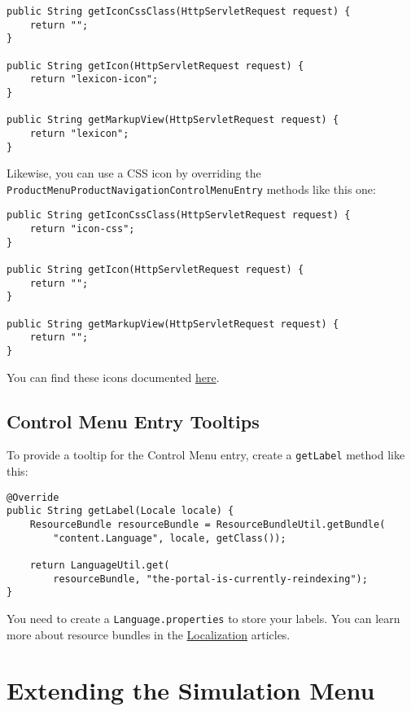 \begin{verbatim}
public String getIconCssClass(HttpServletRequest request) {
    return "";
}

public String getIcon(HttpServletRequest request) {
    return "lexicon-icon";
}

public String getMarkupView(HttpServletRequest request) {
    return "lexicon";
}
\end{verbatim}

Likewise, you can use a CSS icon by overriding the
\texttt{ProductMenuProductNavigationControlMenuEntry} methods like this
one:

\begin{verbatim}
public String getIconCssClass(HttpServletRequest request) {
    return "icon-css";
}

public String getIcon(HttpServletRequest request) {
    return "";
}

public String getMarkupView(HttpServletRequest request) {
    return "";
}
\end{verbatim}

You can find these icons documented
\href{https://clayui.com/docs/components/icons.html}{here}.

\section{Control Menu Entry Tooltips}\label{control-menu-entry-tooltips}

To provide a tooltip for the Control Menu entry, create a
\texttt{getLabel} method like this:

\begin{verbatim}
@Override
public String getLabel(Locale locale) {
    ResourceBundle resourceBundle = ResourceBundleUtil.getBundle(
        "content.Language", locale, getClass());

    return LanguageUtil.get(
        resourceBundle, "the-portal-is-currently-reindexing");
}
\end{verbatim}

You need to create a \texttt{Language.properties} to store your labels.
You can learn more about resource bundles in the
\href{/docs/7-2/frameworks/-/knowledge_base/f/localization}{Localization}
articles.

\chapter{Extending the Simulation
Menu}\label{extending-the-simulation-menu}


